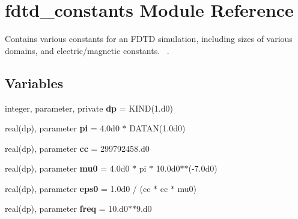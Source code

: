 \hypertarget{namespacefdtd__constants}{}\section{fdtd\+\_\+constants Module Reference}
\label{namespacefdtd__constants}


Contains various constants for an F\+D\+T\+D simulation, including sizes of various domains, and electric/magnetic constants.~\newline
.  


\subsection*{Variables}
\begin{DoxyCompactItemize}
\item 
\hypertarget{namespacefdtd__constants_ae6226badfcd8ad589f23da9c7738698d}{}integer, parameter, private {\bfseries dp} = K\+I\+N\+D(1.d0)\label{namespacefdtd__constants_ae6226badfcd8ad589f23da9c7738698d}

\item 
\hypertarget{namespacefdtd__constants_afea44d02f5a576739aec3ae6a6f88309}{}real(dp), parameter {\bfseries pi} = 4.\+0d0 $\ast$ D\+A\+T\+A\+N(1.\+0d0)\label{namespacefdtd__constants_afea44d02f5a576739aec3ae6a6f88309}

\item 
\hypertarget{namespacefdtd__constants_af9e6f822e2d64af12863c3c8aed3500d}{}real(dp), parameter {\bfseries cc} = 299792458.d0\label{namespacefdtd__constants_af9e6f822e2d64af12863c3c8aed3500d}

\item 
\hypertarget{namespacefdtd__constants_a2f7a20b7c1b87a2b0e5b792091b65003}{}real(dp), parameter {\bfseries mu0} = 4.\+0d0 $\ast$ pi $\ast$ 10.\+0d0$\ast$$\ast$(-\/7.\+0d0)\label{namespacefdtd__constants_a2f7a20b7c1b87a2b0e5b792091b65003}

\item 
\hypertarget{namespacefdtd__constants_ac9c6b1ee3e2b047a115aeff548ce14da}{}real(dp), parameter {\bfseries eps0} = 1.\+0d0 / (cc $\ast$ cc $\ast$ mu0)\label{namespacefdtd__constants_ac9c6b1ee3e2b047a115aeff548ce14da}

\item 
\hypertarget{namespacefdtd__constants_af5f07e0107c8e9c8625adc9a291ca44b}{}real(dp), parameter {\bfseries freq} = 10.d0$\ast$$\ast$9.d0\label{namespacefdtd__constants_af5f07e0107c8e9c8625adc9a291ca44b}


\end{DoxyCompactItemize}
